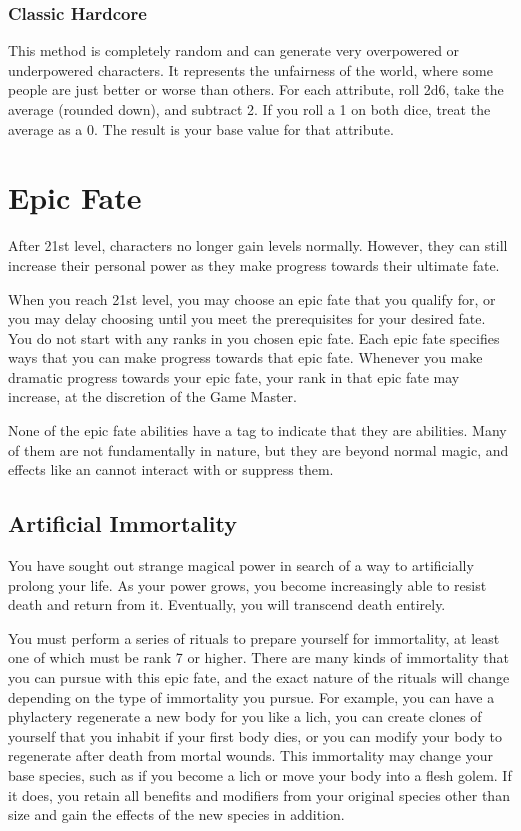         \subsubsection{Classic Hardcore}

            This method is completely random and can generate very overpowered or underpowered characters.
            It represents the unfairness of the world, where some people are just better or worse than others.
            For each attribute, roll 2d6, take the average (rounded down), and subtract 2.
            If you roll a 1 on both dice, treat the average as a 0.
            The result is your base value for that attribute.

\section{Epic Fate}
    After 21st level, characters no longer gain levels normally.
    However, they can still increase their personal power as they make progress towards their ultimate fate.

    When you reach 21st level, you may choose an epic fate that you qualify for, or you may delay choosing until you meet the prerequisites for your desired fate.
    You do not start with any ranks in you chosen epic fate.
    Each epic fate specifies ways that you can make progress towards that epic fate.
    Whenever you make dramatic progress towards your epic fate, your rank in that epic fate may increase, at the discretion of the Game Master.

    None of the epic fate abilities have a tag to indicate that they are  abilities.
    Many of them are not fundamentally  in nature, but they are beyond normal magic, and effects like an  cannot interact with or suppress them.

    \subsection{Artificial Immortality}
        You have sought out strange magical power in search of a way to artificially prolong your life.
        As your power grows, you become increasingly able to resist death and return from it.
        Eventually, you will transcend death entirely.

         You must perform a series of rituals to prepare yourself for immortality, at least one of which must be rank 7 or higher. There are many kinds of immortality that you can pursue with this epic fate, and the exact nature of the rituals will change depending on the type of immortality you pursue. For example, you can have a phylactery regenerate a new body for you like a lich, you can create clones of yourself that you inhabit if your first body dies, or you can modify your body to regenerate after death from mortal wounds. This immortality may change your base species, such as if you become a lich or move your body into a flesh golem. If it does, you retain all benefits and modifiers from your original species other than size and gain the effects of the new species in addition.

